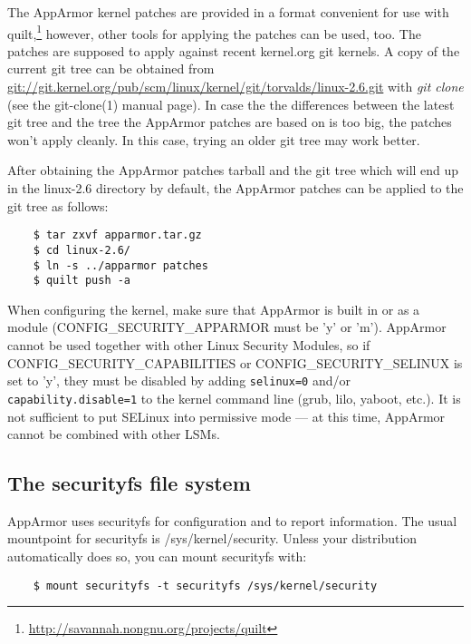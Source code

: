 \documentclass[a4paper]{article}
\renewcommand{\H}{\hspace{0pt}}
\begin{document}
The AppArmor kernel patches are provided in a format convenient for use
with quilt,\footnote{
    \url{http://savannah.nongnu.org/projects/quilt}
} however, other tools for applying the patches can be used, too. The
patches are supposed to apply against recent kernel.org git kernels. A
copy of the current git tree can be obtained from
\url{git://git.kernel.org/pub/scm/linux/kernel/git/torvalds/linux-2.6.git}
with \textit{git clone} (see the \hbox{git-clone(1)} manual page).  In
case the the differences between the latest git tree and the tree the
AppArmor patches are based on is too big, the patches won't apply
cleanly.  In this case, trying an older git tree may work better.

After obtaining the AppArmor patches tarball and the git tree which will
end up in the linux-2.6 directory by default, the AppArmor patches can
be applied to the git tree as follows:

\begin{small}
\begin{verbatim}
    $ tar zxvf apparmor.tar.gz
    $ cd linux-2.6/
    $ ln -s ../apparmor patches
    $ quilt push -a
\end{verbatim}
\end{small}

When configuring the kernel, make sure that AppArmor is built in or as a
module (CONFIG\_{\H}SECURITY\_{\H}APPARMOR must be 'y' or 'm'). AppArmor
cannot be used together with other Linux Security Modules, so if
CONFIG\_{\H}SECURITY\_{\H}CAPABILITIES or CONFIG\_{\H}SECURITY\_{\H}SELINUX is
set to 'y', they must be disabled by adding \texttt{selinux=0} and/or
\texttt{capability.disable=1} to the kernel command line (grub, lilo,
yaboot, etc.).  It is not sufficient to put SELinux into permissive
mode ---  at this time, AppArmor cannot be combined with other LSMs.

\subsection{The securityfs file system}

AppArmor uses securityfs for configuration and to report information.
The usual mountpoint for securityfs is /sys/{\H}kernel/{\H}security.
Unless your distribution automatically does so, you can mount securityfs
with:

\begin{small}
\begin{verbatim}
    $ mount securityfs -t securityfs /sys/kernel/security
\end{verbatim}
\end{small}
\end{document}
